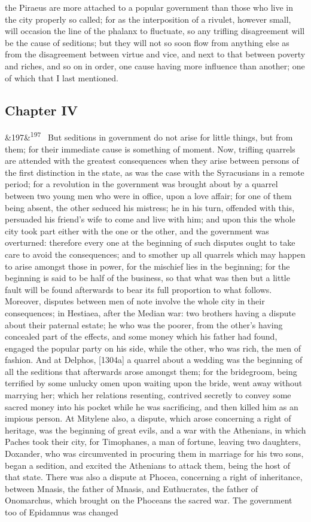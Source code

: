 \documentclass[12pt]{article}
\newcommand{\para}[1][]{\par\noindent\ifx&#1&\else\textsuperscript{\footnotesize #1}~\fi}
\begin{document}
the Piraeus are more attached to a popular government than those who live in the city properly so called; for as the interposition of a rivulet, however small, will occasion the line of the phalanx to fluctuate, so any trifling disagreement will be the cause of seditions; but they will not so soon flow from anything else as from the disagreement between virtue and vice, and next to that between poverty and riches, and so on in order, one cause having more influence than another; one of which that I last mentioned.

\subsection*{Chapter IV}

\para[197] But seditions in government do not arise for little things, but from them; for their immediate cause is something of moment. Now, trifling quarrels are attended with the greatest consequences when they arise between persons of the first distinction in the state, as was the case with the Syracusians in a remote period; for a revolution in the government was brought about by a quarrel between two young men who were in office, upon a love affair; for one of them being absent, the other seduced his mistress; he in his turn, offended with this, persuaded his friend's wife to come and live with him; and upon this the whole city took part either with the one or the other, and the government was overturned: therefore every one at the beginning of such disputes ought to take care to avoid the consequences; and to smother up all quarrels which may happen to arise amongst those in power, for the mischief lies in the beginning; for the beginning is said to be half of the business, so that what was then but a little fault will be found afterwards to bear its full proportion to what follows. Moreover, disputes between men of note involve the whole city in their consequences; in Hestiaea, after the Median war: two brothers having a dispute about their paternal estate; he who was the poorer, from the other's having concealed part of the effects, and some money which his father had found, engaged the popular party on his side, while the other, who was rich, the men of fashion. And at Delphos, [1304a] a quarrel about a wedding was the beginning of all the seditions that afterwards arose amongst them; for the bridegroom, being terrified by some unlucky omen upon waiting upon the bride, went away without marrying her; which her relations resenting, contrived secretly to convey some sacred money into his pocket while he was sacrificing, and then killed him as an impious person. At Mitylene also, a dispute, which arose concerning a right of heritage, was the beginning of great evils, and a war with the Athenians, in which Paches took their city, for Timophanes, a man of fortune, leaving two daughters, Doxander, who was circumvented in procuring them in marriage for his two sons, began a sedition, and excited the Athenians to attack them, being the host of that state. There was also a dispute at Phocea, concerning a right of inheritance, between Mnasis, the father of Mnasis, and Euthucrates, the father of Onomarchus, which brought on the Phoceans the sacred war. The government too of Epidamnus was changed 
\end{document}

